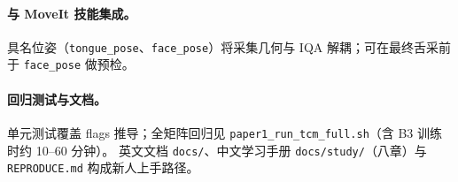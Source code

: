 \paragraph{与 MoveIt 技能集成。}
具名位姿（\texttt{tongue\_pose}、\texttt{face\_pose}）将采集几何与 IQA 解耦；可在最终舌采前于 \texttt{face\_pose} 做预检。

\paragraph{回归测试与文档。}
单元测试覆盖 flags 推导；全矩阵回归见 \texttt{paper1\_run\_tcm\_full.sh}（含 B3 训练时约 10--60 分钟）。
英文文档 \texttt{docs/}、中文学习手册 \texttt{docs/study/}（八章）与 \texttt{REPRODUCE.md} 构成新人上手路径。
